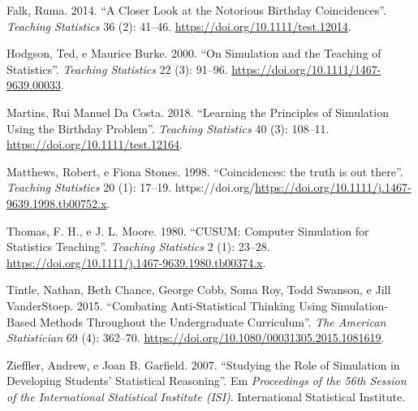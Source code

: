 \documentclass[
  letterpaper,
  DIV=11,
  numbers=noendperiod]{scrreprt}
\newlength{\cslhangindent}
\newenvironment{CSLReferences}[2] %
 {\begin{list}{}{%
  \setlength{\itemindent}{0pt}
  \setlength{\leftmargin}{0pt}
  \setlength{\parsep}{0pt}
  \ifodd #1
   \setlength{\leftmargin}{\cslhangindent}
   \setlength{\itemindent}{-1\cslhangindent}
  \fi
  \setlength{\itemsep}{#2\baselineskip}}}
 {\end{list}}
\begin{document}
\label{refs}
\begin{CSLReferences}{1}{0}
Falk, Ruma. 2014. {``A Closer Look at the Notorious Birthday
Coincidences''}. \emph{Teaching Statistics} 36 (2): 41--46.
\url{https://doi.org/10.1111/test.12014}.

Hodgson, Ted, e Maurice Burke. 2000. {``On Simulation and the Teaching
of Statistics''}. \emph{Teaching Statistics} 22 (3): 91--96.
\url{https://doi.org/10.1111/1467-9639.00033}.

Martins, Rui Manuel Da Costa. 2018. {``Learning the Principles of
Simulation Using the Birthday Problem''}. \emph{Teaching Statistics} 40
(3): 108--11. \url{https://doi.org/10.1111/test.12164}.

Matthews, Robert, e Fiona Stones. 1998. {``Coincidences: the truth is
out there''}. \emph{Teaching Statistics} 20 (1): 17--19.
https://doi.org/\url{https://doi.org/10.1111/j.1467-9639.1998.tb00752.x}.

Thomas, F. H., e J. L. Moore. 1980. {``{CUSUM}: Computer Simulation for
Statistics Teaching''}. \emph{Teaching Statistics} 2 (1): 23--28.
\url{https://doi.org/10.1111/j.1467-9639.1980.tb00374.x}.

Tintle, Nathan, Beth Chance, George Cobb, Soma Roy, Todd Swanson, e Jill
VanderStoep. 2015. {``Combating Anti-Statistical Thinking Using
Simulation-Based Methods Throughout the Undergraduate Curriculum''}.
\emph{The American Statistician} 69 (4): 362--70.
\url{https://doi.org/10.1080/00031305.2015.1081619}.

Zieffler, Andrew, e Joan B. Garfield. 2007. {``Studying the Role of
Simulation in Developing Students' Statistical Reasoning''}. Em
\emph{Proceedings of the 56th Session of the International Statistical
Institute (ISI)}. International Statistical Institute.

\end{CSLReferences}
\end{document}
